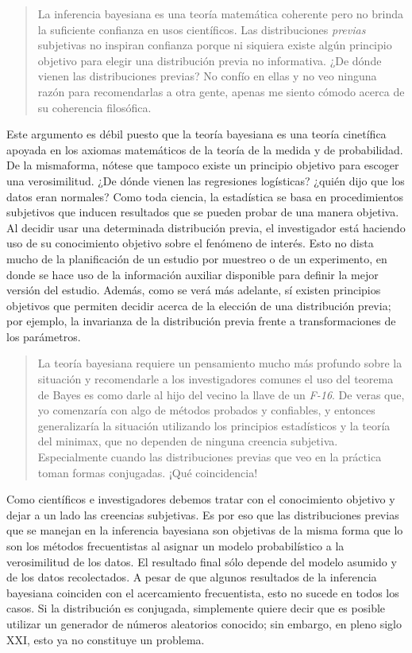 \documentclass[
  10pt,
  spanish,
]{book}
\theoremstyle{definition}
\theoremstyle{definition}
\theoremstyle{definition}
\theoremstyle{definition}
\theoremstyle{remark}
\begin{document}
\begin{quote}
La inferencia bayesiana es una teoría matemática coherente pero no brinda la suficiente confianza en usos científicos. Las distribuciones \emph{previas} subjetivas no inspiran confianza porque ni siquiera existe algún principio objetivo para elegir una distribución previa no informativa. ¿De dónde vienen las distribuciones previas? No confío en ellas y no veo ninguna razón para recomendarlas a otra gente, apenas me siento cómodo acerca de su coherencia filosófica.
\end{quote}

Este argumento es débil puesto que la teoría bayesiana es una teoría cinetífica apoyada en los axiomas matemáticos de la teoría de la medida y de probabilidad. De la mismaforma, nótese que tampoco existe un principio objetivo para escoger una verosimilitud. ¿De dónde vienen las regresiones logísticas? ¿quién dijo que los datos eran normales? Como toda ciencia, la estadística se basa en procedimientos subjetivos que inducen resultados que se pueden probar de una manera objetiva. Al decidir usar una determinada distribución previa, el investigador está haciendo uso de su conocimiento objetivo sobre el fenómeno de interés. Esto no dista mucho de la planificación de un estudio por muestreo o de un experimento, en donde se hace uso de la información auxiliar disponible para definir la mejor versión del estudio. Además, como se verá más adelante, sí existen principios objetivos que permiten decidir acerca de la elección de una distribución previa; por ejemplo, la invarianza de la distribución previa frente a transformaciones de los parámetros.

\begin{quote}
La teoría bayesiana requiere un pensamiento mucho más profundo sobre la situación y recomendarle a los investigadores comunes el uso del teorema de Bayes es como darle al hijo del vecino la llave de un \emph{F-16}. De veras que, yo comenzaría con algo de métodos probados y confiables, y entonces generalizaría la situación utilizando los principios estadísticos y la teoría del minimax, que no dependen de ninguna creencia subjetiva. Especialmente cuando las distribuciones previas que veo en la práctica toman formas conjugadas. ¡Qué coincidencia!
\end{quote}

Como científicos e investigadores debemos tratar con el conocimiento objetivo y dejar a un lado las creencias subjetivas. Es por eso que las distribuciones previas que se manejan en la inferencia bayesiana son objetivas de la misma forma que lo son los métodos frecuentistas al asignar un modelo probabilístico a la verosimilitud de los datos. El resultado final sólo depende del modelo asumido y de los datos recolectados. A pesar de que algunos resultados de la inferencia bayesiana coinciden con el acercamiento frecuentista, esto no sucede en todos los casos. Si la distribución es conjugada, simplemente quiere decir que es posible utilizar un generador de números aleatorios conocido; sin embargo, en pleno siglo XXI, esto ya no constituye un problema.
\end{document}

